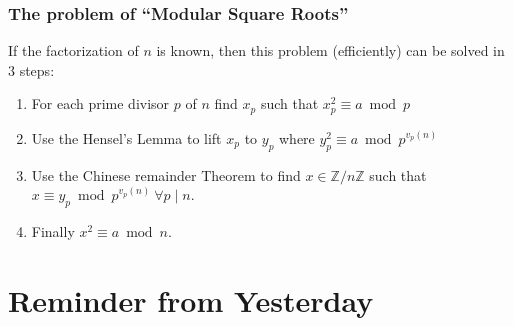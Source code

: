 \documentclass[10pt,handout]{beamer} %
\newcommand{\Z}{\mathbb Z}
\newcommand{\N}{\mathbb N}
\theoremstyle{definition}
\begin{document}
\begin{frame}
\frametitle{The problem of ``Modular Square Roots''} 

\pause

If the factorization of $n$ is known, then this problem (efficiently) can be solved in 3 steps:

{\begin{enumerate}[<+-| alert@+>]
 \item {For each prime divisor $p$ of $n$ find $x_p$ such that $x_p^2\equiv a \bmod p$}
\item {Use the Hensel's Lemma to lift $x_p$ to $y_p$ where $y_p^2\equiv a\bmod p^{v_p(n)}$}
\item {Use the Chinese remainder Theorem to find $x\in\Z/n\Z$ such that}\\ {$x\equiv y_p\bmod p^{v_p(n)} \ \forall p\mid n$.}
\item {Finally $x^2\equiv a\bmod n$.}
\end{enumerate}}\pause

 \end{frame}




\section{Reminder from Yesterday}
\end{document}
